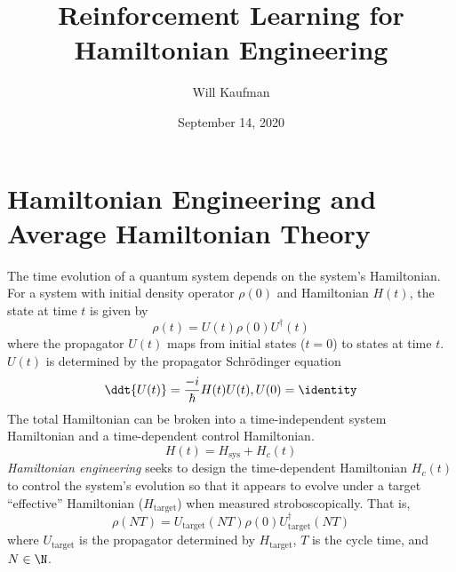 \documentclass[twocolumn, aps, 10pt]{revtex4-2}
\begin{document}

\title{Reinforcement Learning for Hamiltonian Engineering}
\author{Will Kaufman}
\date{September 14, 2020}


\maketitle


\section{Hamiltonian Engineering and Average Hamiltonian Theory}

The time evolution of a quantum system depends on the system's Hamiltonian. For a system with initial density operator $\rho(0)$ and Hamiltonian $H(t)$, the state at time $t$ is given by
\[
\rho(t) = U(t)\rho(0)U^\dagger(t)
\]
where the propagator $U(t)$ maps from initial states ($t=0$) to states at time $t$. $U(t)$ is determined by the propagator Schrödinger equation
\begin{equation}\label{eq:time_evolution_diff_eq}
    \ddt{U(t)} = \frac{-i}{\hbar} H(t) U(t), U(0) = \identity
\end{equation}
The total Hamiltonian can be broken into a time-independent system Hamiltonian and a time-dependent control Hamiltonian.
\begin{equation}
    H(t) = H_\text{sys} + H_c(t)
\end{equation}
\emph{Hamiltonian engineering} seeks to design the time-dependent Hamiltonian $H_c(t)$ to control the system's evolution so that it appears to evolve under a target ``effective'' Hamiltonian ($H_\text{target}$) when measured stroboscopically. That is,
\begin{equation}\label{eq:strob_measure}
    \rho(NT) = U_\text{target}(NT) \rho(0) U_\text{target}^\dagger(NT)
\end{equation}
where $U_\text{target}$ is the propagator determined by $H_\text{target}$, $T$ is the cycle time, and $N \in \N$.
\end{document}
